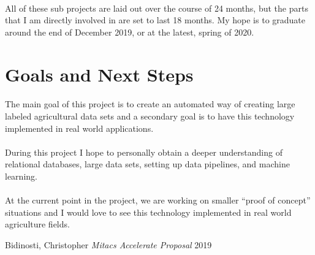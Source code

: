 \documentclass[12pt]{article}
\begin{document}
		\paragraph{}
			All of these sub projects are laid out over the course of 24 months, but the parts that I am directly involved in are set to last 18 months.  My hope is to graduate around the end of December 2019, or at the latest, spring of 2020.
			
	\section{Goals and Next Steps}
		\paragraph{}
			The main goal of this project is to create an automated way of creating large labeled agricultural data sets and a secondary goal is to have this technology implemented in real world applications.
		\paragraph{}
			During this project I hope to personally obtain a deeper understanding of relational databases, large data sets, setting up data pipelines, and machine learning.
		
		\paragraph{}
			At the current point in the project, we are working on smaller \enquote{proof of concept} situations and I would love to see this technology implemented in real world agriculture fields.
		
	
	
	\newpage
	\patchcmd{\thebibliography}{\section*}{\section}{}{}
	
	\begin{thebibliography}{}
		 Bidinosti, Christopher {\em Mitacs Accelerate Proposal} 2019
	\end{thebibliography}
	
\end{document}
